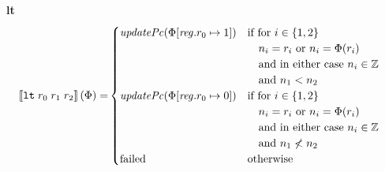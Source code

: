 \documentclass[a4paper]{article}
\newcommand{\sem}[1]{\left\llbracket #1 \right\rrbracket}
\newcommand{\targetcolor}[1]{\color{black}}
\newcommand{\trg}[1]{{\targetcolor{} #1}}
\newcommand{\zinstr}[1]{\texttt{#1}}
\newcommand{\threeinstr}[4]{
  \ifthenelse{\equal{#2#3#4}{}}
  {\zinstr{#1}}
  {\zinstr{#1} \; #2 \; #3 \; #4}
}
\newcommand{\tlt}[3]{\threeinstr{\trg{lt}}{#1}{#2}{#3}}
\newcommand{\ints}{\mathbb{Z}}
\newcommand{\update}[2]{[#1 \mapsto #2]}
\newcommand{\updReg}[2]{\update{\reg.#1}{#2}}
\newcommand{\failed}{\mathrm{failed}}
\newcommand{\var}[1]{\mathit{#1}}
\newcommand{\reg}{\var{reg}}
\newcommand{\plainfun}[2]{
  \ifthenelse{\equal{#2}{}}
  {\mathit{#1}}
  {\mathit{#1}(#2)}
}
\newcommand{\updPcAddr}[1]{\plainfun{updatePc}{#1}}
\begin{document}
\noindent\textbf{lt}\\
\begin{align*}
  \sem{\tlt{r_0}{r_1}{r_2}}(\Phi) = &
                                                  \begin{cases}
                                                    \updPcAddr{\Phi\updReg{r_0}{1}} &
                                                    \arraycolsep=0pt
                                                    \begin{array}[t]{l}
                                                      \text{if for $i \in \{1,2\}$}\\
                                                      \quad\text{$n_i = r_i$ or $n_i = \Phi(r_i)$}\\
                                                      \quad\text{and in either case $n_i \in \ints$}\\
                                                      \quad\text{and $n_1 < n_2$}\\        
                                                    \end{array}\\
                                                    \updPcAddr{\Phi\updReg{r_0}{0}} &
                                                    \arraycolsep=0pt
                                                    \begin{array}[t]{l}
                                                      \text{if for $i \in \{1,2\}$}\\
                                                      \quad\text{$n_i = r_i$ or $n_i = \Phi(r_i)$}\\
                                                      \quad\text{and in either case $n_i \in \ints$}\\
                                                      \quad\text{and $n_1 \not< n_2$}\\        
                                                    \end{array}\\
                                                    \failed & \text{otherwise}
                                                  \end{cases}  
\end{align*}
\end{document}
